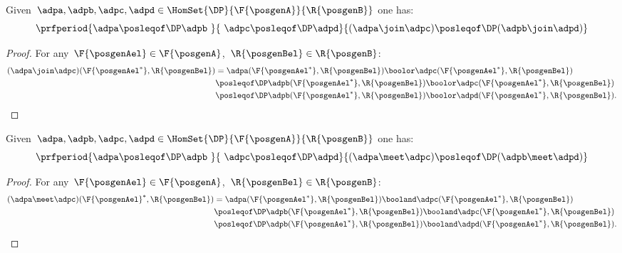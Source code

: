 \begin{lemma}
    \label{lem:coprod_mon}
    Given~$\adpa,\adpb,\adpc,\adpd \in \HomSet{\DP}{\F{\posgenA}}{\R{\posgenB}}$ one has:
    \begin{equation*}
        \prfperiod{\adpa\posleqof\DP \adpb\ }{\ \adpc\posleqof\DP\adpd}{(\adpa\join\adpc)\posleqof\DP (\adpb\join \adpd)}
    \end{equation*}
\end{lemma}
\begin{proof}
    For any~$\F{\posgenAel}\in \F{\posgenA}$,~$\R{\posgenBel}\in \R{\posgenB}$:
    \begin{equation*}
        \begin{aligned}
            (\adpa \join \adpc)(\F{\posgenAel^*},\R{\posgenBel})
             & =\adpa(\F{\posgenAel^*},\R{\posgenBel})\boolor \adpc(\F{\posgenAel^*},\R{\posgenBel})             \\
             & \posleqof\DP \adpb(\F{\posgenAel^*},\R{\posgenBel})\boolor \adpc(\F{\posgenAel^*},\R{\posgenBel})  \\
             & \posleqof\DP \adpb(\F{\posgenAel^*},\R{\posgenBel})\boolor \adpd(\F{\posgenAel^*},\R{\posgenBel}).
        \end{aligned}
    \end{equation*}
\end{proof}

\begin{lemma}
    \label{lem:intersection_mon}
    Given~$\adpa,\adpb,\adpc,\adpd \in \HomSet{\DP}{\F{\posgenA}}{\R{\posgenB}}$ one has:
    \begin{equation*}
        \prfperiod{\adpa\posleqof\DP \adpb\ }{\ \adpc\posleqof\DP \adpd}{(\adpa\meet \adpc)\posleqof\DP (\adpb\meet \adpd)}
    \end{equation*}
\end{lemma}
\begin{proof}
    For any~$\F{\posgenAel}\in \F{\posgenA}$,~$\R{\posgenBel}\in \R{\posgenB}$:
    \begin{equation*}
        \begin{aligned}
            (\adpa \meet \adpc)(\F{\posgenAel}^*,\R{\posgenBel})
             & =\adpa(\F{\posgenAel^*},\R{\posgenBel})\booland \adpc(\F{\posgenAel^*},\R{\posgenBel})             \\
             & \posleqof\DP \adpb(\F{\posgenAel^*},\R{\posgenBel})\booland \adpc(\F{\posgenAel^*},\R{\posgenBel})  \\
             & \posleqof\DP \adpb(\F{\posgenAel^*},\R{\posgenBel})\booland \adpd(\F{\posgenAel^*},\R{\posgenBel}).
        \end{aligned}
    \end{equation*}
\end{proof}
